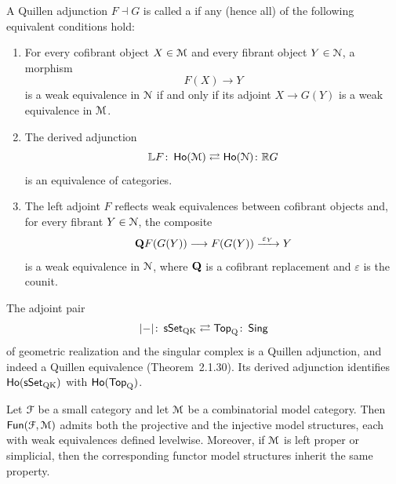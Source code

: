 \begin{definition}
  A Quillen adjunction $F \dashv G$ is called a  if
  any (hence all) of the following equivalent conditions hold:
  \begin{enumerate}
    \item For every cofibrant object $X \in \mathcal M$ and every fibrant object
      $Y \in \mathcal N$, a morphism
      \begin{equation}
        F(X) \longrightarrow Y
      \end{equation}
      is a weak equivalence in $\mathcal N$ if and only if its adjoint
      $X \to G(Y)$ is a weak equivalence in $\mathcal M$.
    \item The derived adjunction
      \begin{equation}
        \mathbb L F \colon \operatorname{\sf Ho}(\mathcal M) \rightleftarrows \operatorname{\sf Ho}(\mathcal N) \colon \mathbb R G
      \end{equation}
      is an equivalence of categories.
    \item The left adjoint $F$ reflects weak equivalences between cofibrant
      objects and, for every fibrant $Y \in \mathcal N$, the composite
      \begin{equation}
        \mathbf Q F(G(Y)) \longrightarrow F(G(Y)) \xrightarrow{\;\varepsilon_Y\;} Y
      \end{equation}
      is a weak equivalence in $\mathcal N$, where $\mathbf Q$ is a cofibrant replacement
      and $\varepsilon$ is the counit.
  \end{enumerate}
\end{definition}

\begin{example}
  The adjoint pair
  \[
    |{-}| \colon \operatorname{\sf sSet}_{\mathrm{QK}}
    \rightleftarrows
    \operatorname{\mathsf{Top}}_{\mathrm Q} \colon \operatorname{\mathsf{Sing}}
\]
  of geometric realization and the singular complex is a Quillen adjunction,
  and indeed a Quillen equivalence (Theorem~\textup{2.1.30}).  Its derived
  adjunction identifies $\operatorname{\sf Ho}(\operatorname{\sf sSet}_{\mathrm{QK}})$ with $\operatorname{\sf Ho}(\operatorname{\mathsf{Top}}_{\mathrm Q})$.
\end{example}

\begin{theorem}
  \label{ch2:: thm: functor model structures}
  Let $\mathcal F$ be a small category and let $\mathcal M$ be a combinatorial model
  category. Then $\operatorname{{\sf Fun}}(\mathcal F,\mathcal M)$ admits both the projective and the injective
  model structures, each with weak equivalences defined levelwise. Moreover, if
  $\mathcal M$ is left proper or simplicial, then the corresponding functor model
  structures inherit the same property.
\end{theorem}


